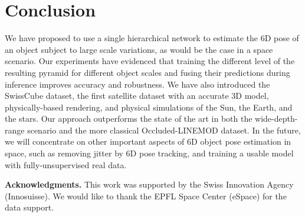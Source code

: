 
\section{Conclusion}
\label{sec:conclusion}

We have proposed to use a single hierarchical network to estimate the 6D pose of an object subject to large scale variations, as would be the case in a space scenario. Our experiments have evidenced that training the different level of the resulting pyramid for different object scales and fusing their predictions during inference improves accuracy and robustness. We have also introduced the SwissCube dataset, the first satellite dataset with an accurate 3D model, physically-based rendering, and physical simulations of the Sun, the Earth, and the stars. Our approach outperforms the state of the art in both the wide-depth-range scenario and the more classical Occluded-LINEMOD dataset. In the future, we will concentrate on other important aspects of 6D object pose estimation in space, such as removing jitter by 6D pose tracking, and training a usable model with fully-unsupervised real data.

\vspace{0.2em}
{\noindent \bf Acknowledgments.}
This work was supported by the Swiss Innovation Agency (Innosuisse). We would like to thank the EPFL Space Center (eSpace) for the data support.